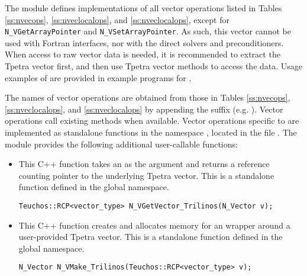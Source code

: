 The {\nvectrilinos} module defines implementations of all vector operations listed
in Tables \ref{ss:nvecops}, \ref{ss:nveclocalops}, and
\ref{ss:nveclocalops}, except for \verb|N_VGetArrayPointer| and
\verb|N_VSetArrayPointer|. As such, this vector cannot be used with
{\sundials} Fortran interfaces, nor with the {\sundials} direct
solvers and preconditioners. When access to raw vector data is needed, it is
recommended to extract the {\trilinos} Tpetra vector first, and then use Tpetra vector
methods to access the data. Usage examples of {\nvectrilinos} are provided in
example programs for {\ida} \cite{ida_ex}.

The names of vector operations are obtained from those in
Tables \ref{ss:nvecops}, \ref{ss:nveclocalops}, and \ref{ss:nveclocalops} by appending the
suffix  (e.g. ).
Vector operations call existing  methods when available. Vector
operations specific to {\sundials} are implemented as standalone functions in the namespace
, located in the file .
The module {\nvectrilinos} provides the following additional user-callable functions:
\begin{itemize}



\item {}

  This C++ function takes an  as the argument and returns a reference
  counting pointer to the underlying Tpetra vector. This is a standalone function
  defined in the global namespace.

\begin{verbatim}
Teuchos::RCP<vector_type> N_VGetVector_Trilinos(N_Vector v);
\end{verbatim}



\item {}

  This C++ function creates and allocates memory for an {\nvectrilinos}
  wrapper around a user-provided Tpetra vector. This is a standalone function
  defined in the global namespace.

\begin{verbatim}
N_Vector N_VMake_Trilinos(Teuchos::RCP<vector_type> v);
\end{verbatim}


\end{itemize}
